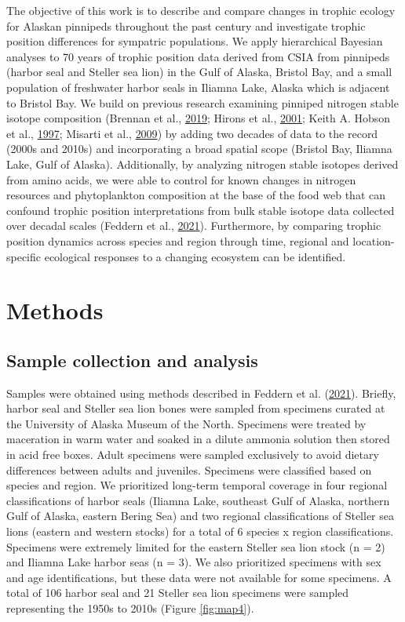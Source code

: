 \documentclass [11pt, proquest] {uwthesis}[2015/03/03]
\begin{document}
The objective of this work is to describe and compare changes in trophic
ecology for Alaskan pinnipeds throughout the past century and
investigate trophic position differences for sympatric populations. We
apply hierarchical Bayesian analyses to 70 years of trophic position
data derived from CSIA from pinnipeds (harbor seal and Steller sea lion)
in the Gulf of Alaska, Bristol Bay, and a small population of freshwater
harbor seals in Iliamna Lake, Alaska which is adjacent to Bristol Bay.
We build on previous research examining pinniped nitrogen stable isotope
composition (Brennan et al., \protect\hyperlink{ref-Brennan2019}{2019};
Hirons et al., \protect\hyperlink{ref-Hirons2001}{2001}; Keith A. Hobson
et al., \protect\hyperlink{ref-Hobson1997}{1997}; Misarti et al.,
\protect\hyperlink{ref-Misarti2009}{2009}) by adding two decades of data
to the record (2000s and 2010s) and incorporating a broad spatial scope
(Bristol Bay, Iliamna Lake, Gulf of Alaska). Additionally, by analyzing
nitrogen stable isotopes derived from amino acids, we were able to
control for known changes in nitrogen resources and phytoplankton
composition at the base of the food web that can confound trophic
position interpretations from bulk stable isotope data collected over
decadal scales (Feddern et al.,
\protect\hyperlink{ref-Feddern2021}{2021}). Furthermore, by comparing
trophic position dynamics across species and region through time,
regional and location-specific ecological responses to a changing
ecosystem can be identified.

\section{Methods}\label{methods-3}

\subsection{Sample collection and
analysis}\label{sample-collection-and-analysis-2}

Samples were obtained using methods described in Feddern et al.
(\protect\hyperlink{ref-Feddern2021}{2021}). Briefly, harbor seal and
Steller sea lion bones were sampled from specimens curated at the
University of Alaska Museum of the North. Specimens were treated by
maceration in warm water and soaked in a dilute ammonia solution then
stored in acid free boxes. Adult specimens were sampled exclusively to
avoid dietary differences between adults and juveniles. Specimens were
classified based on species and region. We prioritized long-term
temporal coverage in four regional classifications of harbor seals
(Iliamna Lake, southeast Gulf of Alaska, northern Gulf of Alaska,
eastern Bering Sea) and two regional classifications of Steller sea
lions (eastern and western stocks) for a total of 6 species x region
classifications. Specimens were extremely limited for the eastern
Steller sea lion stock (n = 2) and Iliamna Lake harbor seas (n = 3). We
also prioritized specimens with sex and age identifications, but these
data were not available for some specimens. A total of 106 harbor seal
and 21 Steller sea lion specimens were sampled representing the 1950s to
2010s (Figure \ref{fig:map4}).
\end{document}
